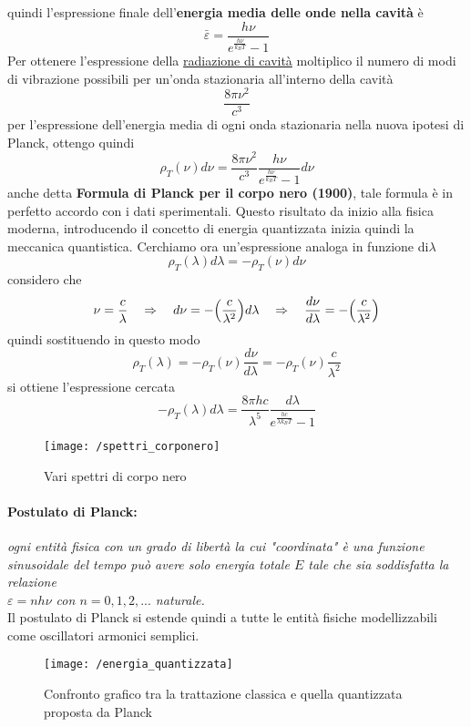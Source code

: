 quindi l'espressione finale dell'\textbf{energia media delle onde nella cavità} è
\begin{equation}
\bar\varepsilon = \frac{ h\nu}{ e^{ \frac{ h\nu}{k_BT }} - 1} 
\end{equation}
Per ottenere l'espressione della \underline{radiazione di cavità} moltiplico il numero di modi di vibrazione possibili per un'onda stazionaria all'interno della cavità
$$\frac{ 8\pi\nu^2}{c^3 }$$
per l'espressione dell'energia media di ogni onda stazionaria nella nuova ipotesi di Planck, ottengo quindi
\begin{equation}
\rho_T(\nu) d\nu = \frac{ 8\pi\nu^2}{c^3 } \frac{ h\nu}{ e^{ \frac{ h\nu}{k_BT }} - 1} d\nu
\end{equation}
anche detta \textbf{Formula di Planck per il corpo nero (1900)}, tale formula è in perfetto accordo con i dati sperimentali.
Questo risultato da inizio alla fisica moderna, introducendo il concetto di energia quantizzata inizia quindi la meccanica quantistica.
Cerchiamo ora un'espressione analoga in funzione di$\lambda$
$$\rho_T(\lambda) d\lambda = -\rho_T(\nu)d\nu $$
considero che
$$\nu = \frac{ c}{\lambda } \quad \Rightarrow \quad d\nu = -\Bigl(  \frac{ c}{\lambda^2 }  \Bigr) d\lambda \quad \Rightarrow \quad \frac{ d\nu}{d\lambda } = -\Bigl(  \frac{ c}{\lambda^2 }  \Bigr) $$
quindi sostituendo in questo modo
$$\rho_T(\lambda) = -\rho_T(\nu) \frac{ d\nu}{d\lambda } = -\rho_T(\nu) \frac{ c}{\lambda^2 }$$
si ottiene l'espressione cercata
\begin{equation}
-\rho_T(\lambda) d\lambda = \frac{ 8\pi h c }{\lambda^5 } \frac{ d\lambda}{e^{ \frac{ hc}{\lambda k_B T } } -1 }
\end{equation}
\begin{figure}[h]
\centering
\texttt{[image: /spettri\_corponero]}
\caption{Vari spettri di corpo nero}
\end{figure}

\paragraph{Postulato di Planck:} \textit{ogni entità fisica con un grado di libertà la cui "coordinata" è una funzione sinusoidale del tempo può avere solo energia totale $E$ tale che sia soddisfatta la relazione \\
$\varepsilon = n h \nu$ con $n=0,1,2, ...$ naturale.} \\
Il postulato di Planck si estende quindi a tutte le entità fisiche modellizzabili come oscillatori armonici semplici.
\begin{figure}[h]
\centering
\texttt{[image: /energia\_quantizzata]}
\caption{Confronto grafico tra la trattazione classica e quella quantizzata proposta da Planck}
\end{figure} 

